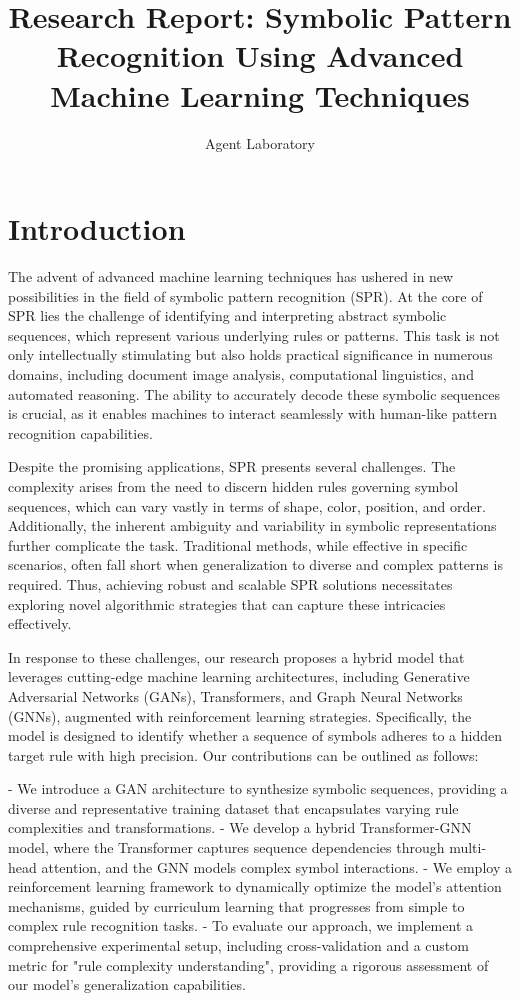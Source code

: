 \documentclass{article}
\title{Research Report: Symbolic Pattern Recognition Using Advanced Machine Learning Techniques}
\author{Agent Laboratory}
\begin{document}
\maketitle

\begin{abstract}

\end{abstract}

\section{Introduction}
The advent of advanced machine learning techniques has ushered in new possibilities in the field of symbolic pattern recognition (SPR). At the core of SPR lies the challenge of identifying and interpreting abstract symbolic sequences, which represent various underlying rules or patterns. This task is not only intellectually stimulating but also holds practical significance in numerous domains, including document image analysis, computational linguistics, and automated reasoning. The ability to accurately decode these symbolic sequences is crucial, as it enables machines to interact seamlessly with human-like pattern recognition capabilities.

Despite the promising applications, SPR presents several challenges. The complexity arises from the need to discern hidden rules governing symbol sequences, which can vary vastly in terms of shape, color, position, and order. Additionally, the inherent ambiguity and variability in symbolic representations further complicate the task. Traditional methods, while effective in specific scenarios, often fall short when generalization to diverse and complex patterns is required. Thus, achieving robust and scalable SPR solutions necessitates exploring novel algorithmic strategies that can capture these intricacies effectively.

In response to these challenges, our research proposes a hybrid model that leverages cutting-edge machine learning architectures, including Generative Adversarial Networks (GANs), Transformers, and Graph Neural Networks (GNNs), augmented with reinforcement learning strategies. Specifically, the model is designed to identify whether a sequence of symbols adheres to a hidden target rule with high precision. Our contributions can be outlined as follows:

- We introduce a GAN architecture to synthesize symbolic sequences, providing a diverse and representative training dataset that encapsulates varying rule complexities and transformations.
- We develop a hybrid Transformer-GNN model, where the Transformer captures sequence dependencies through multi-head attention, and the GNN models complex symbol interactions.
- We employ a reinforcement learning framework to dynamically optimize the model's attention mechanisms, guided by curriculum learning that progresses from simple to complex rule recognition tasks.
- To evaluate our approach, we implement a comprehensive experimental setup, including cross-validation and a custom metric for "rule complexity understanding", providing a rigorous assessment of our model's generalization capabilities.
\end{document}
